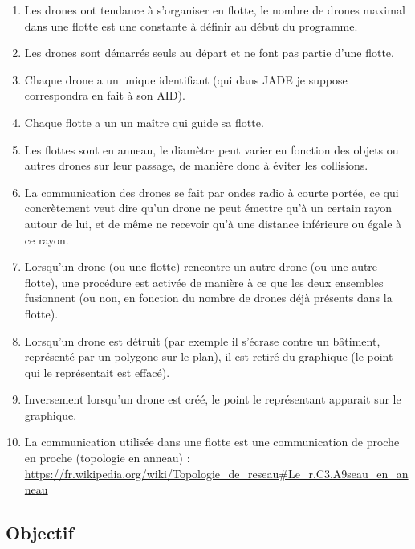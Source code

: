 \documentclass[11pt]{report}
\begin{document}
\begin{enumerate}
\item Les drones ont tendance à s'organiser en flotte, le nombre de drones maximal dans une flotte est une constante à définir au début du programme.

\item Les drones sont démarrés seuls au départ et ne font pas partie d'une flotte.

\item Chaque drone a un unique identifiant (qui dans JADE je suppose correspondra en fait à son AID).

\item Chaque flotte a un un maître qui guide sa flotte.

\item Les flottes sont en anneau, le diamètre peut varier en fonction des objets ou autres drones sur leur passage, de manière donc à éviter les collisions.

\item La communication des drones se fait par ondes radio à courte portée, ce qui concrètement veut dire qu'un drone ne peut émettre qu'à un certain rayon autour de lui, et de même ne recevoir qu'à une distance inférieure ou égale à ce rayon.

\item Lorsqu'un drone (ou une flotte) rencontre un autre drone (ou une autre flotte), une procédure est activée de manière à ce que les deux ensembles fusionnent (ou non, en fonction du nombre de drones déjà présents dans la flotte).

\item Lorsqu'un drone est détruit (par exemple il s'écrase contre un bâtiment, représenté par un polygone sur le plan), il est retiré du graphique (le point qui le représentait est effacé).

\item Inversement lorsqu'un drone est créé, le point le représentant apparait sur le graphique.

\item La communication utilisée dans une flotte est une communication de proche en proche (topologie en anneau) : \url{https://fr.wikipedia.org/wiki/Topologie_de_reseau#Le_r.C3.A9seau_en_anneau}
\end{enumerate}

\newpage
\subsection{Objectif}
\end{document}
